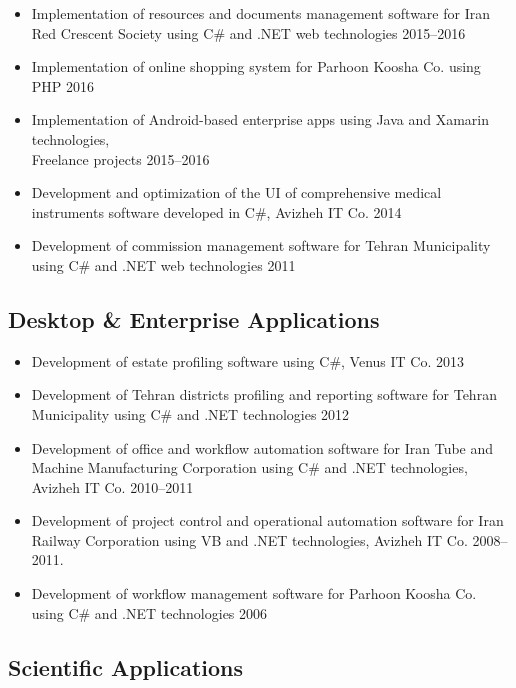 \documentclass{cv}
\begin{document}
\begin{itemize}

\item
Implementation of resources and documents management software for Iran Red Crescent Society using C\# and .NET web technologies \hfill 2015--2016
\item
Implementation of online shopping system for Parhoon Koosha Co. using PHP \hfill 2016
\item
Implementation of Android-based enterprise apps using Java and Xamarin technologies, \\Freelance projects \hfill 2015--2016
\item
Development and optimization of the UI of comprehensive medical instruments software developed in C\#, Avizheh IT Co. \hfill 2014
\item
Development of commission management software for Tehran Municipality using C\# and .NET web technologies \hfill 2011

\end{itemize}


\subsection{Desktop \& Enterprise Applications}

\begin{itemize}

\item
Development of estate profiling software using C\#, Venus IT Co. \hfill 2013
\item
Development of Tehran districts profiling and reporting software for Tehran Municipality using C\# and .NET technologies \hfill 2012
\item
Development of office and workflow automation software for Iran Tube and Machine Manufacturing Corporation using C\# and .NET technologies, Avizheh IT Co. \hfill 2010--2011
\item
Development of project control and operational automation software for Iran Railway Corporation using VB and .NET technologies, Avizheh IT Co. \hfill 2008--2011.
\item
Development of workflow management software for Parhoon Koosha Co. using C\# and .NET technologies \hfill 2006

\end{itemize}


\subsection{Scientific Applications}
\end{document}
